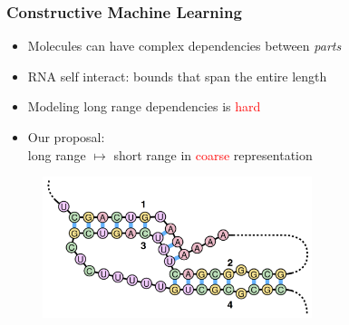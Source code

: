 \documentclass{beamer}
\newcommand{\red}[1]{\textcolor{red}{#1}}
\begin{document}
\begin{frame}
\frametitle{Constructive Machine Learning}

    \begin{itemize}
        \item Molecules can have complex dependencies between {\em parts}
        \item RNA self interact: bounds that span the entire length
        \item Modeling long range dependencies is \red{hard}
        \item Our proposal:\\ long range $\mapsto$ short range in \red{coarse} representation
    \end{itemize}
    \begin{figure}[ht]
        \centering
        \includegraphics[width=0.7\textwidth]{images/rna.png}
    \end{figure}    
\end{frame}
\end{document}
